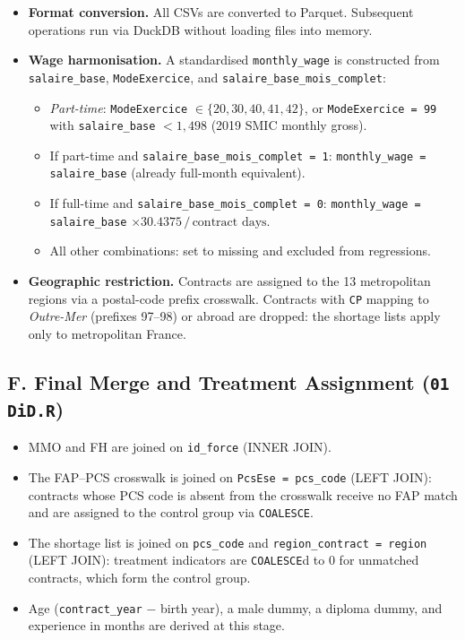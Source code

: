 \begin{itemize}
  \item \textbf{Format conversion.} All CSVs are converted to Parquet.
  Subsequent operations run via DuckDB without loading files into memory.

  \item \textbf{Wage harmonisation.} A standardised \texttt{monthly\_wage}
  is constructed from \texttt{salaire\_base}, \texttt{ModeExercice}, and
  \texttt{salaire\_base\_mois\_complet}:
  \begin{itemize}
    \item \textit{Part-time}: \texttt{ModeExercice} $\in \{20,30,40,41,42\}$,
    or \texttt{ModeExercice = 99} with \texttt{salaire\_base} $< 1{,}498$
    (2019 SMIC monthly gross).
    \item If part-time and \texttt{salaire\_base\_mois\_complet = 1}:
    \texttt{monthly\_wage = salaire\_base} (already full-month equivalent).
    \item If full-time and \texttt{salaire\_base\_mois\_complet = 0}:
    \texttt{monthly\_wage = salaire\_base} $\times 30.4375\,/\,\text{contract days}$.
    \item All other combinations: set to missing and excluded from regressions.
  \end{itemize}

  \item \textbf{Geographic restriction.} Contracts are assigned to the
  13 metropolitan regions via a postal-code prefix crosswalk. Contracts
  with \texttt{CP} mapping to \textit{Outre-Mer} (prefixes 97--98) or
  abroad are dropped: the shortage lists apply only to metropolitan France.
\end{itemize}

\subsection*{F. Final Merge and Treatment Assignment
\textnormal{\small(\texttt{01 DiD.R})}}

\begin{itemize}
  \item MMO and FH are joined on \texttt{id\_force} (INNER JOIN).
  \item The FAP--PCS crosswalk is joined on \texttt{PcsEse = pcs\_code}
  (LEFT JOIN): contracts whose PCS code is absent from the crosswalk receive
  no FAP match and are assigned to the control group via \texttt{COALESCE}.
  \item The shortage list is joined on \texttt{pcs\_code} and
  \texttt{region\_contract = region} (LEFT JOIN): treatment indicators
  are \texttt{COALESCE}d to 0 for unmatched contracts, which form
  the control group.
  \item Age (\texttt{contract\_year} $-$ birth year), a male dummy,
  a diploma dummy, and experience in months are derived at this stage.
\end{itemize}
